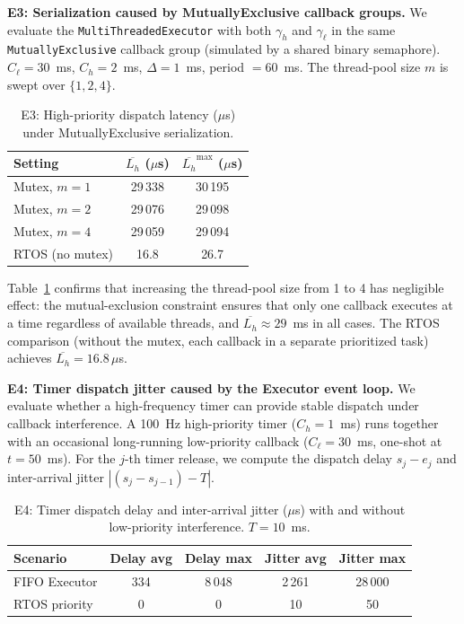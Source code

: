 \textbf{E3: Serialization caused by MutuallyExclusive callback groups.}
We evaluate the \texttt{MultiThreadedExecutor} with both $\gamma_h$ and $\gamma_\ell$ in the same \texttt{MutuallyExclusive} callback group (simulated by a shared binary semaphore). $C_\ell = 30$~ms, $C_h = 2$~ms, $\Delta = 1$~ms, period $= 60$~ms. The thread-pool size $m$ is swept over $\{1, 2, 4\}$.

\begin{table}[t]
\centering
\caption{E3: High-priority dispatch latency ($\mu$s) under MutuallyExclusive serialization.}
\label{tab:e3}
\begin{tabular}{lcc}
\hline
\textbf{Setting} & $\overline{L_h}$ ($\mu$s) & $\overline{L_h}^{\max}$ ($\mu$s) \\
\hline
Mutex, $m=1$ & 29\,338 & 30\,195 \\
Mutex, $m=2$ & 29\,076 & 29\,098 \\
Mutex, $m=4$ & 29\,059 & 29\,094 \\
RTOS (no mutex) & 16.8 & 26.7 \\
\hline
\end{tabular}
\end{table}

Table~\ref{tab:e3} confirms that increasing the thread-pool size from 1 to 4 has negligible effect: the mutual-exclusion constraint ensures that only one callback executes at a time regardless of available threads, and $\overline{L_h} \approx 29$~ms in all cases. The RTOS comparison (without the mutex, each callback in a separate prioritized task) achieves $\overline{L_h} = 16.8\,\mu$s.

\textbf{E4: Timer dispatch jitter caused by the Executor event loop.}
We evaluate whether a high-frequency timer can provide stable dispatch under callback interference. A 100~Hz high-priority timer ($C_h = 1$~ms) runs together with an occasional long-running low-priority callback ($C_\ell = 30$~ms, one-shot at $t = 50$~ms). For the $j$-th timer release, we compute the dispatch delay $s_j - e_j$ and inter-arrival jitter $|(s_j - s_{j-1}) - T|$.

\begin{table}[t]
\centering
\caption{E4: Timer dispatch delay and inter-arrival jitter ($\mu$s) with and without low-priority interference. $T = 10$~ms.}
\label{tab:e4}
\begin{tabular}{lcccc}
\hline
\textbf{Scenario} & Delay avg & Delay max & Jitter avg & Jitter max \\
\hline
FIFO Executor  & 334 & 8\,048 & 2\,261 & 28\,000 \\
RTOS priority  & 0   & 0      & 10    & 50 \\
\hline
\end{tabular}
\end{table}

